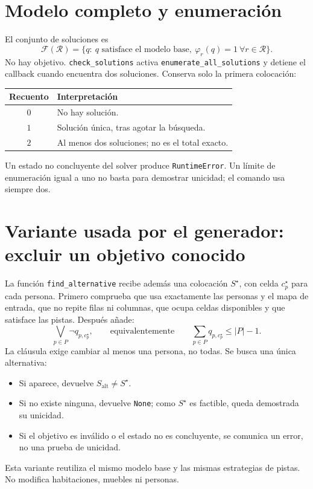 \documentclass[11pt,a4paper]{article}
\begin{document}
\section{Modelo completo y enumeraci\'on}

El conjunto de soluciones es
\[
 \mathcal F(\mathcal R)=
 \{q:\ q\text{ satisface el modelo base},\
       \varphi_r(q)=1\ \forall r\in\mathcal R\}.
\]
No hay objetivo. \texttt{check\_solutions} activa
\texttt{enumerate\_all\_solutions} y detiene el callback cuando encuentra
dos soluciones. Conserva solo la primera colocaci\'on:
\begin{center}
\begin{tabular}{cl}
\hline
Recuento & Interpretaci\'on\\
\hline
$0$ & No hay soluci\'on.\\
$1$ & Soluci\'on \'unica, tras agotar la b\'usqueda.\\
$2$ & Al menos dos soluciones; no es el total exacto.\\
\hline
\end{tabular}
\end{center}
Un estado no concluyente del solver produce \texttt{RuntimeError}.
Un l\'imite de enumeraci\'on igual a uno no basta para demostrar
unicidad; el comando usa siempre dos.

\section{Variante usada por el generador: excluir un objetivo conocido}

La funci\'on \texttt{find\_alternative} recibe adem\'as una colocaci\'on
$S^\star$, con celda $c_p^\star$ para cada persona. Primero comprueba
que usa exactamente las personas y el mapa de entrada, que no repite
filas ni columnas, que ocupa celdas disponibles y que satisface las
pistas. Despu\'es a\~nade:
\[
 \bigvee_{p\in P}\neg q_{p,c_p^\star},
 \qquad\text{equivalentemente}\qquad
 \sum_{p\in P}q_{p,c_p^\star}\leq |P|-1.
\]
La cl\'ausula exige cambiar al menos una persona, no todas. Se busca
una \'unica alternativa:
\begin{itemize}
  \item Si aparece, devuelve $S_{\mathrm{alt}}\neq S^\star$.
  \item Si no existe ninguna, devuelve \texttt{None}; como $S^\star$
        es factible, queda demostrada su unicidad.
  \item Si el objetivo es inv\'alido o el estado no es concluyente,
        se comunica un error, no una prueba de unicidad.
\end{itemize}
Esta variante reutiliza el mismo modelo base y las mismas estrategias
de pistas. No modifica habitaciones, muebles ni personas.
\end{document}
